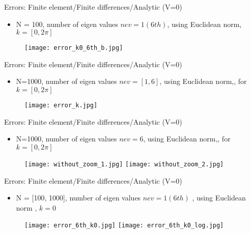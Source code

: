 \documentclass{beamer}
\begin{document}
\begin{frame}{Errors: Finite element/Finite differences/Analytic (V=0)}
\begin{itemize}
    \item N = 100, number of eigen values $nev=1 (6th)$, using Euclidean norm, $k=[0, 2\pi]$
\end{itemize}
 \begin{figure}
    \texttt{[image: error\_k0\_6th\_b.jpg]} 
\end{figure} 
\end{frame}

\begin{frame}{Errors: Finite element/Finite differences/Analytic (V=0)}
\begin{itemize}
    \item N=1000,  number of eigen values $nev=[1,6]$, using Euclidean norm,, for $k=[0,2\pi]$
\end{itemize}
 \begin{figure}
    \texttt{[image: error\_k.jpg]}
\end{figure} 
\end{frame}


\begin{frame}{Errors: Finite element/Finite differences/Analytic (V=0)}
\begin{itemize}
    \item N=1000,  number of eigen values $nev=6$, using Euclidean norm,, for $k=[0,2\pi]$
\end{itemize}
 \begin{figure}
    \texttt{[image: without\_zoom\_1.jpg]}
    \texttt{[image: without\_zoom\_2.jpg]} 
\end{figure} 
\end{frame}


\begin{frame}{Errors: Finite element/Finite differences/Analytic (V=0)}
    \begin{itemize}
        \item N = [100, 1000], number of eigen values $nev=1 (6th)$ , using Euclidean norm , $k=0$
    \end{itemize}

    \begin{figure}
    \texttt{[image: error\_6th\_k0.jpg]} 
    \texttt{[image: error\_6th\_k0\_log.jpg]} 
    \end{figure} 
\end{frame}
\end{document}
